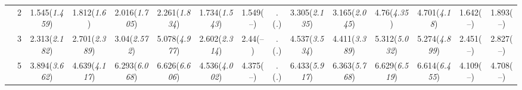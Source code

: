 \documentclass{article}
\begin{document}
\begin{table}[tbp]
{\begin{tabularx}{\textwidth}{lCCCCCCCCCCCCCC}
&2&1.545\newline (\emph{1.459})&1.812\newline (\emph{1.6})&2.016\newline (\emph{1.705})&2.261\newline (\emph{1.834})&1.734\newline (\emph{1.543})&1.549\newline (--)&.\newline (\emph{.})&3.305\newline (\emph{2.135})&3.165\newline (\emph{2.045})&4.76\newline (\emph{4.35})&4.701\newline (\emph{4.18})&1.642\newline (--)&1.893\newline (--) \tabularnewline
&3&2.313\newline (\emph{2.182})&2.701\newline (\emph{2.389})&3.04\newline (\emph{2.572})&5.078\newline (\emph{4.977})&2.602\newline (\emph{2.314})&2.44\newline (--)&.\newline (\emph{.})&4.537\newline (\emph{3.534})&4.411\newline (\emph{3.389})&5.312\newline (\emph{5.032})&5.274\newline (\emph{4.899})&2.451\newline (--)&2.827\newline (--) \tabularnewline
&5&3.894\newline (\emph{3.662})&4.639\newline (\emph{4.117})&6.293\newline (\emph{6.068})&6.626\newline (\emph{6.606})&4.536\newline (\emph{4.002})&4.375\newline (--)&.\newline (\emph{.})&6.433\newline (\emph{5.917})&6.363\newline (\emph{5.768})&6.629\newline (\emph{6.519})&6.614\newline (\emph{6.455})&4.109\newline (--)&4.708\newline (--) \tabularnewline

\end{tabularx}}
\end{table}
\end{document}
